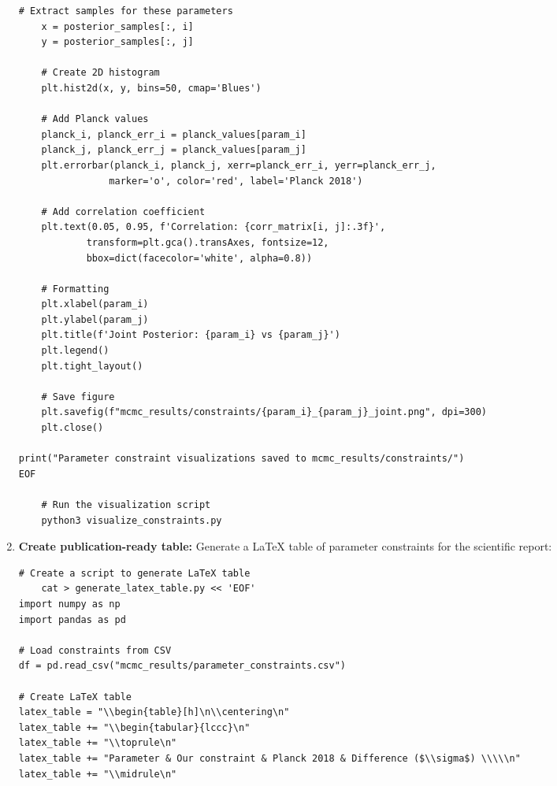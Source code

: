 \documentclass[11pt]{article}
\begin{document}
\begin{enumerate}
\begin{lstlisting}[basicstyle=\small\ttfamily]
    # Extract samples for these parameters
    x = posterior_samples[:, i]
    y = posterior_samples[:, j]
    
    # Create 2D histogram
    plt.hist2d(x, y, bins=50, cmap='Blues')
    
    # Add Planck values
    planck_i, planck_err_i = planck_values[param_i]
    planck_j, planck_err_j = planck_values[param_j]
    plt.errorbar(planck_i, planck_j, xerr=planck_err_i, yerr=planck_err_j,
                marker='o', color='red', label='Planck 2018')
    
    # Add correlation coefficient
    plt.text(0.05, 0.95, f'Correlation: {corr_matrix[i, j]:.3f}',
            transform=plt.gca().transAxes, fontsize=12,
            bbox=dict(facecolor='white', alpha=0.8))
    
    # Formatting
    plt.xlabel(param_i)
    plt.ylabel(param_j)
    plt.title(f'Joint Posterior: {param_i} vs {param_j}')
    plt.legend()
    plt.tight_layout()
    
    # Save figure
    plt.savefig(f"mcmc_results/constraints/{param_i}_{param_j}_joint.png", dpi=300)
    plt.close()

print("Parameter constraint visualizations saved to mcmc_results/constraints/")
EOF

    # Run the visualization script
    python3 visualize_constraints.py
    \end{lstlisting}
    
    \item \textbf{Create publication-ready table:} Generate a LaTeX table of parameter constraints for the scientific report:
    \begin{lstlisting}[basicstyle=\small\ttfamily]
    # Create a script to generate LaTeX table
    cat > generate_latex_table.py << 'EOF'
import numpy as np
import pandas as pd

# Load constraints from CSV
df = pd.read_csv("mcmc_results/parameter_constraints.csv")

# Create LaTeX table
latex_table = "\\begin{table}[h]\n\\centering\n"
latex_table += "\\begin{tabular}{lccc}\n"
latex_table += "\\toprule\n"
latex_table += "Parameter & Our constraint & Planck 2018 & Difference ($\\sigma$) \\\\\n"
latex_table += "\\midrule\n"


\end{lstlisting}
\end{enumerate}
\end{document}
